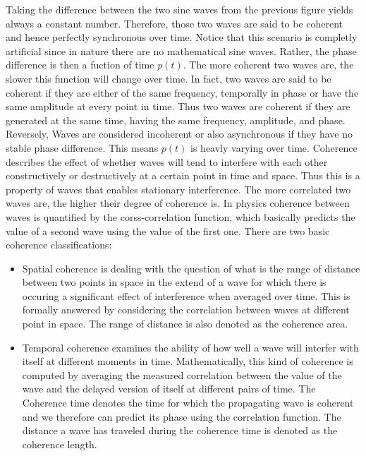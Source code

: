 Taking the difference between the two sine waves from the previous figure yields always a constant number. Therefore, those two waves are said to be coherent and hence perfectly synchronous over time. Notice that this scenario is completly artificial since in nature there are no mathematical sine waves. Rather, the phase difference is then a fuction of time $p(t)$. The more coherent two waves are, the slower this function will change over time. 
In fact, two waves are said to be coherent if they are either of the same frequency, temporally in phase or have the same amplitude at every point in time.
Thus two waves are coherent if they are generated at the same time, having the same frequency, amplitude, and phase. Reversely, Waves are considered incoherent or also asynchronous if they have no stable phase difference. This means $p(t)$ is heavly varying over time. Coherence describes the effect of whether waves will tend to interfere with each other constructively or destructively at a certain point in time and space. Thus this is a property of waves that enables stationary interference. The more correlated two waves are, the higher their degree of coherence is. In physics coherence between waves is quantified by the corss-correlation function, which basically predicts the value of a second wave using the value of the first one. There are two basic coherence classifications:

\begin{itemize}
  \item Spatial coherence is dealing with the question of what is the range of distance between two points in space in the extend of a wave for which there is occuring a significant effect of interference when averaged over time. This is formally answered by considering the correlation between waves at different point in space. The range of distance is also denoted as the coherence area.
  \item Temporal coherence examines the ability of how well a wave will interfer with itself at different moments in time. Mathematically, this kind of coherence is computed by averaging the measured correlation between the value of the wave and the delayed version of itself at different pairs of time. The Coherence time denotes the time for which the propagating wave is coherent and we therefore can predict its phase using the correlation function. The distance a wave has traveled during the coherence time is denoted as the coherence length.
\end{itemize}



